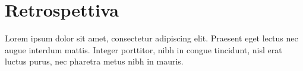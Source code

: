 \chapter{Retrospettiva}
Lorem ipsum dolor sit amet, consectetur adipiscing elit. Praesent eget lectus
nec augue interdum mattis. Integer porttitor, nibh in congue tincidunt, nisl
erat luctus purus, nec pharetra metus nibh in mauris.
